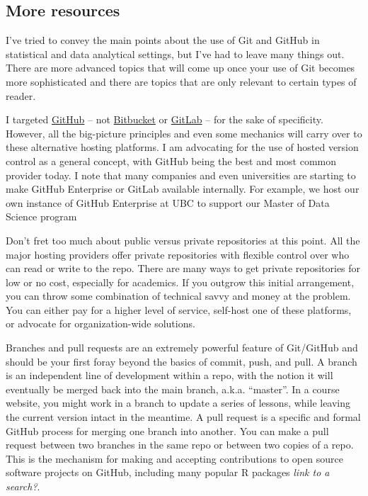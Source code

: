 \documentclass[12pt]{article}
\begin{document}
\subsection{More resources}\label{more-resources}

I've tried to convey the main points about the use of Git and GitHub in
statistical and data analytical settings, but I've had to leave many
things out. There are more advanced topics that will come up once your
use of Git becomes more sophisticated and there are topics that are only
relevant to certain types of reader.

I targeted \href{https://github.com}{GitHub} -- not
\href{https://bitbucket.org}{Bitbucket} or
\href{https://about.gitlab.com}{GitLab} -- for the sake of specificity.
However, all the big-picture principles and even some mechanics will
carry over to these alternative hosting platforms. I am advocating for
the use of hosted version control as a general concept, with GitHub
being the best and most common provider today. I note that many
companies and even universities are starting to make GitHub Enterprise
or GitLab available internally. For example, we host our own instance of
GitHub Enterprise at UBC to support our Master of Data Science program

Don't fret too much about public versus private repositories at this
point. All the major hosting providers offer private repositories with
flexible control over who can read or write to the repo. There are many
ways to get private repositories for low or no cost, especially for
academics. If you outgrow this initial arrangement, you can throw some
combination of technical savvy and money at the problem. You can either
pay for a higher level of service, self-host one of these platforms, or
advocate for organization-wide solutions.

Branches and pull requests are an extremely powerful feature of
Git/GitHub and should be your first foray beyond the basics of commit,
push, and pull. A branch is an independent line of development within a
repo, with the notion it will eventually be merged back into the main
branch, a.k.a. ``master''. In a course website, you might work in a
branch to update a series of lessons, while leaving the current version
intact in the meantime. A pull request is a specific and formal GitHub
process for merging one branch into another. You can make a pull request
between two branches in the same repo or between two copies of a repo.
This is the mechanism for making and accepting contributions to open
source software projects on GitHub, including many popular R packages
\emph{link to a search?}.
\end{document}
